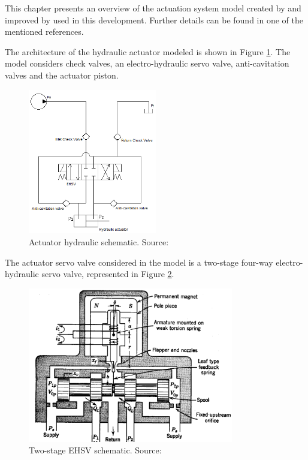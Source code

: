 
This chapter presents an overview of the actuation system model created by  and improved by  used in this development. Further details can be found in one of the mentioned references. 

The architecture of the hydraulic actuator modeled is shown in Figure \ref{fig:3_HydArch}. The model considers check valves, an electro-hydraulic servo valve, anti-cavitation valves and the actuator piston.

\begin{figure}[H]
	\centering
	\centerline{\includegraphics[width=0.5\textwidth]{Figuras/3.ActuationSystemModel/3-act_hyd_schematic.png}}
	\caption{Actuator hydraulic schematic. Source: }
	\label{fig:3_HydArch}
\end{figure}

The actuator servo valve considered in the model is a two-stage four-way electro-hydraulic servo valve, represented in Figure \ref{fig:3_EHSV}.

\begin{figure}[H]
	\centering
	\centerline{\includegraphics[width=0.8\textwidth]{Figuras/3.ActuationSystemModel/3-EHSV_moog.png}}
	\caption{Two-stage EHSV schematic. Source: }
	\label{fig:3_EHSV}
\end{figure}

